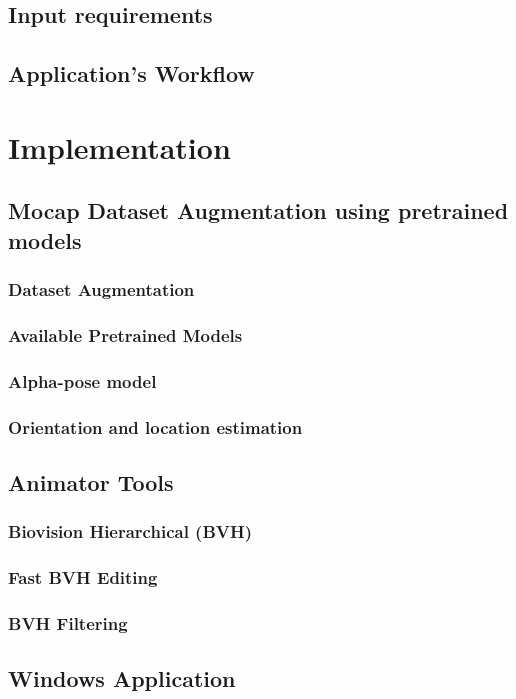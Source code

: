\documentclass[12pt,oneside,a4paper,english]{article}
\begin{document}
\subsection{Input requirements}

\subsection{Application's Workflow}

\newpage
\section{Implementation}
\subsection{Mocap Dataset Augmentation using pretrained models}
\subsubsection{Dataset Augmentation}
\subsubsection{Available Pretrained Models}
\subsubsection{Alpha-pose model}
\subsubsection{Orientation and location estimation}
\subsection{Animator Tools}
\subsubsection{Biovision Hierarchical (BVH)}
\subsubsection{Fast BVH Editing}
\subsubsection{BVH Filtering}
\subsection{Windows Application}
\end{document}
